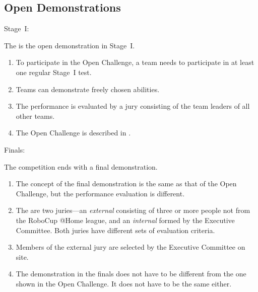 \subsection{Open Demonstrations} \label{sec:open-demonstrations}
\begin{enumerate}
  {\bf\item Stage~I:} The  is the open demonstration in Stage~I.
  \begin{enumerate}
  \item To participate in the Open Challenge, a team needs to participate in at least one regular Stage~I test.
  \item Teams can demonstrate freely chosen abilities. 
  \item The performance is evaluated by a jury consisting of the team leaders of all other teams.
  \item The Open Challenge is described in .
  \end{enumerate}
  {\bf\item Finals:} The competition ends with a final demonstration.
  \begin{enumerate}
  \item The concept of the final demonstration is the same as that of the Open Challenge, but the performance evaluation is different. 
  \item The are two juries---an \emph{external} consisting of three or more people not from the RoboCup @Home league, and an \emph{internal} formed by the Executive Committee. Both juries have different sets of evaluation criteria.
  \item Members of the external jury are selected by the Executive Committee on site. 
  \item The demonstration in the finals does not have to be different from the one shown in the Open Challenge. It does not have to be the same either.
  \end{enumerate}
\end{enumerate}


